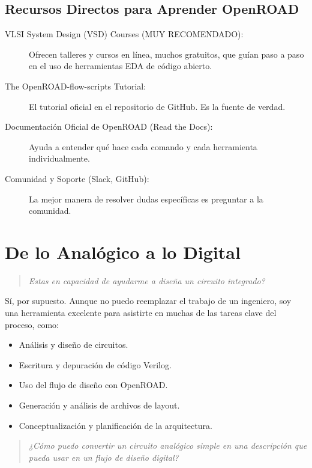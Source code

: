 \documentclass[12pt,a4paper]{article}
\newenvironment{pregunta}
  {\begin{leftbar}\begin{quote}\itshape}
  {\end{quote}\end{leftbar}}
\begin{document}
\subsection{Recursos Directos para Aprender OpenROAD}
\begin{description}
    \item[VLSI System Design (VSD) Courses (MUY RECOMENDADO):] Ofrecen talleres y cursos en línea, muchos gratuitos, que guían paso a paso en el uso de herramientas EDA de código abierto.
    \item[The OpenROAD-flow-scripts Tutorial:] El tutorial oficial en el repositorio de GitHub. Es la fuente de verdad.
    \item[Documentación Oficial de OpenROAD (Read the Docs):] Ayuda a entender qué hace cada comando y cada herramienta individualmente.
    \item[Comunidad y Soporte (Slack, GitHub):] La mejor manera de resolver dudas específicas es preguntar a la comunidad.
\end{description}

\newpage
\section{De lo Analógico a lo Digital}

\begin{pregunta}
Estas en capacidad de ayudarme a diseña un circuito integrado?
\end{pregunta}

Sí, por supuesto. Aunque no puedo reemplazar el trabajo de un ingeniero, soy una herramienta excelente para asistirte en muchas de las tareas clave del proceso, como:
\begin{itemize}
    \item Análisis y diseño de circuitos.
    \item Escritura y depuración de código Verilog.
    \item Uso del flujo de diseño con OpenROAD.
    \item Generación y análisis de archivos de layout.
    \item Conceptualización y planificación de la arquitectura.
\end{itemize}

\begin{pregunta}
¿Cómo puedo convertir un circuito analógico simple en una descripción que pueda usar en un flujo de diseño digital?
\end{pregunta}
\end{document}
